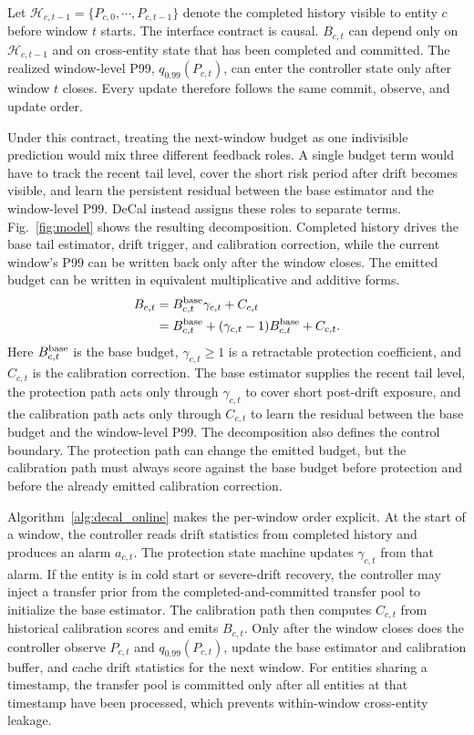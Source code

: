 \documentclass[sigplan,10pt, anonymous]{acmart}
\begin{document}
Let $\mathcal{H}_{c,t-1}=\{P_{c,0},\cdots,P_{c,t-1}\}$ denote the completed history visible to entity $c$ before window $t$ starts. The interface contract is causal. $B_{c,t}$ can depend only on $\mathcal{H}_{c,t-1}$ and on cross-entity state that has been completed and committed. The realized window-level P99, $q_{0.99}(P_{c,t})$, can enter the controller state only after window $t$ closes. Every update therefore follows the same commit, observe, and update order.

Under this contract, treating the next-window budget as one indivisible prediction would mix three different feedback roles. A single budget term would have to track the recent tail level, cover the short risk period after drift becomes visible, and learn the persistent residual between the base estimator and the window-level P99. DeCal instead assigns these roles to separate terms. Fig.~\ref{fig:model} shows the resulting decomposition. Completed history drives the base tail estimator, drift trigger, and calibration correction, while the current window's P99 can be written back only after the window closes. The emitted budget can be written in equivalent multiplicative and additive forms.
\begin{equation}
\label{eq:budget_decomposition}
\begin{aligned}
B_{c,t}
&= B_{c,t}^{\rm base}\gamma_{c,t}+C_{c,t} \\
&= B_{c,t}^{\rm base}
 + (\gamma_{c,t}-1)B_{c,t}^{\rm base}
 + C_{c,t} .
\end{aligned}
\end{equation}
Here $B_{c,t}^{\rm base}$ is the base budget, $\gamma_{c,t}\ge1$ is a retractable protection coefficient, and $C_{c,t}$ is the calibration correction. The base estimator supplies the recent tail level, the protection path acts only through $\gamma_{c,t}$ to cover short post-drift exposure, and the calibration path acts only through $C_{c,t}$ to learn the residual between the base budget and the window-level P99. The decomposition also defines the control boundary. The protection path can change the emitted budget, but the calibration path must always score against the base budget before protection and before the already emitted calibration correction.

Algorithm~\ref{alg:decal_online} makes the per-window order explicit. At the start of a window, the controller reads drift statistics from completed history and produces an alarm $a_{c,t}$. The protection state machine updates $\gamma_{c,t}$ from that alarm. If the entity is in cold start or severe-drift recovery, the controller may inject a transfer prior from the completed-and-committed transfer pool to initialize the base estimator. The calibration path then computes $C_{c,t}$ from historical calibration scores and emits $B_{c,t}$. Only after the window closes does the controller observe $P_{c,t}$ and $q_{0.99}(P_{c,t})$, update the base estimator and calibration buffer, and cache drift statistics for the next window. For entities sharing a timestamp, the transfer pool is committed only after all entities at that timestamp have been processed, which prevents within-window cross-entity leakage.
\end{document}
